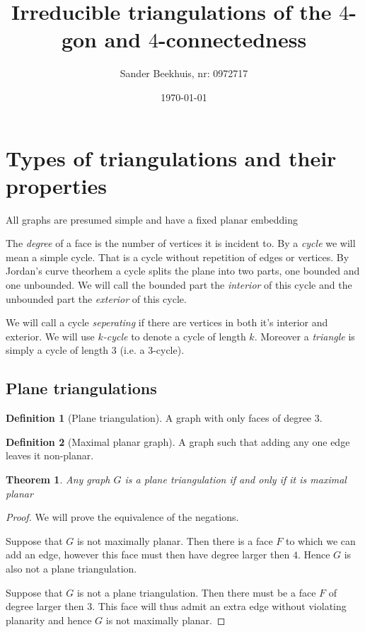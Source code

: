 \documentclass[a4paper]{article}
\title{Irreducible triangulations of the $4$-gon and $4$-connectedness }
\author{Sander Beekhuis, nr: 0972717}
\date{\today} %
\newtheorem{thrm}{Theorem}
\theoremstyle{definition}
\newtheorem*{defi}{Definition}
\newcommand{\ifftext}{if and only if }
\begin{document}
\maketitle

\section{Types of triangulations and their properties}

All graphs are presumed simple and have a fixed planar embedding

The \emph{degree} of a face is the number of vertices it is incident to. By a \emph{cycle} we will mean a simple cycle. That is a cycle without repetition of edges or vertices. By Jordan's curve theorhem a cycle splits the plane into two parts, one bounded and one unbounded. %
We will call the bounded part the \emph{interior} of this cycle and the unbounded part the \emph{exterior} of this cycle.

We will call a cycle \emph{seperating} if there are vertices in both it's interior and exterior. We will use \emph{$k$-cycle} to denote a cycle of length $k$. Moreover a \emph{triangle} is simply a cycle of length $3$ (i.e. a $3$-cycle). 


\subsection{Plane triangulations}

\begin{defi} [Plane triangulation]
A graph with only faces of degree $3$.
\end{defi}


\begin{defi} [Maximal planar graph]
A graph such that adding any one edge leaves it non-planar.
\end{defi}

\begin{thrm}
Any graph $G$ is a plane triangulation \ifftext it is maximal planar
\end{thrm}

\begin{proof}
We will prove the equivalence of the negations.

Suppose that $G$ is not maximally planar. Then there is a face $F$ to which we can add an edge, however this face must then have degree larger then $4$. Hence $G$ is also not a plane triangulation. 

Suppose that $G$ is not a plane triangulation. Then there must be a face $F$ of degree larger then $3$. This face will thus admit an extra edge without violating planarity and hence $G$ is not maximally planar.
\end{proof}
\end{document}
